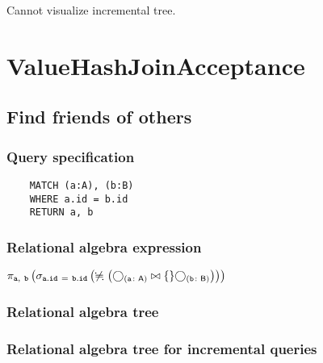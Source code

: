 	Cannot visualize incremental tree.

	\section{ValueHashJoinAcceptance}

	\subsection{Find friends of others}

	\subsubsection*{Query specification}

	\begin{lstlisting}
	MATCH (a:A), (b:B)
	WHERE a.id = b.id
	RETURN a, b
	\end{lstlisting}


	\subsubsection*{Relational algebra expression}

	$\projection{\var{a},~\var{b}} \left(\selection{\mathtt{a.id~=~b.id}} \left(\alldifferent{} \left(\getvertices{a}{A} \join \{\} \getvertices{b}{B}\right)\right)\right)$

	\subsubsection*{Relational algebra tree}


	\subsubsection*{Relational algebra tree for incremental queries}

